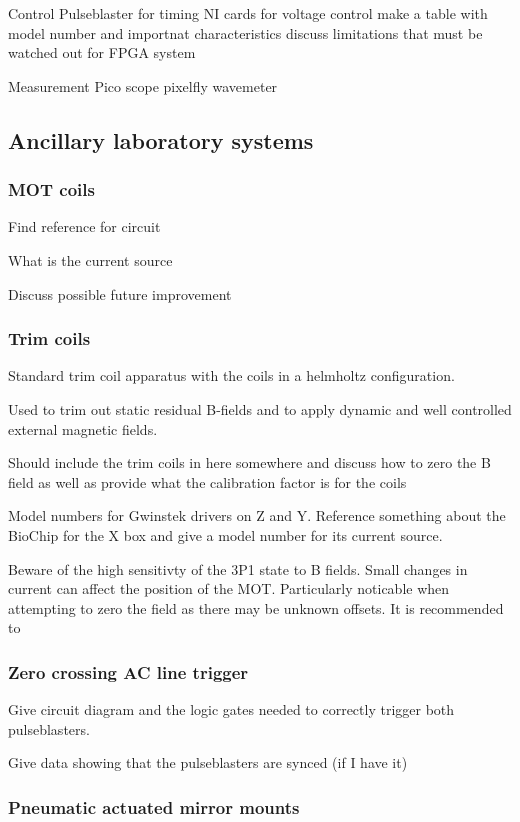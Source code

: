 Control
	Pulseblaster for timing
	NI cards for voltage control
		make a table with model number and importnat characteristics
		discuss limitations that must be watched out for
	FPGA system

Measurement
	Pico scope
	pixelfly
	wavemeter

\subsection{Ancillary laboratory systems} \label{ssec:misc_sys}

\subsubsection{MOT coils}

Find reference for circuit

What is the current source

Discuss possible future improvement

\subsubsection{Trim coils}

Standard trim coil apparatus with the coils in a helmholtz configuration.

Used to trim out static residual B-fields and to apply dynamic and well controlled external magnetic fields.

Should include the trim coils in here somewhere and discuss how to zero the B field as well as provide what the calibration factor is for the coils

Model numbers for Gwinstek drivers on Z and Y. Reference something about the BioChip for the X box and give a model number for its current source.

Beware of the high sensitivty of the 3P1 state to B fields. Small changes in current can affect the position of the MOT. Particularly noticable when attempting to zero the field as there may be unknown offsets. It is recommended to 

\subsubsection{Zero crossing AC line trigger}

Give circuit diagram and the logic gates needed to correctly trigger both pulseblasters.

Give data showing that the pulseblasters are synced (if I have it)

\subsubsection{Pneumatic actuated mirror mounts}

